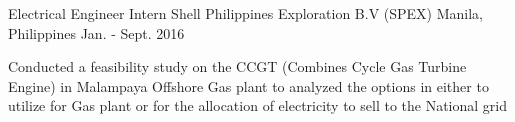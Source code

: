 \begin{cventries}
  \cventry
  {Electrical Engineer Intern}
  {Shell Philippines Exploration B.V (SPEX)}
  {Manila, Philippines}
  {Jan. - Sept. 2016}
  {
    \begin{cvitems}
      \item{Conducted a feasibility study on the CCGT (Combines Cycle Gas Turbine Engine) in Malampaya Offshore Gas plant to analyzed the options in either to utilize for Gas plant or for the allocation of electricity to sell to the National grid}
    \end{cvitems}
    \vspace{1em}
  }
\end{cventries}
